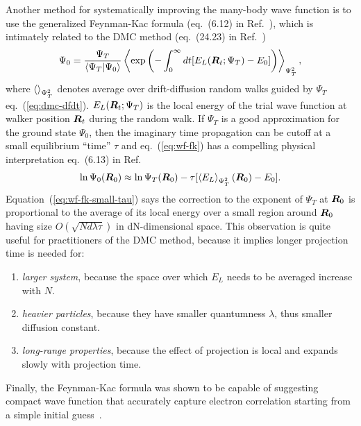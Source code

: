 Another method for systematically improving the many-body wave function is to use the generalized Feynman-Kac formula (eq.~(6.12) in Ref.~\cite{Martin2016}), which is intimately related to the DMC method (eq.~(24.23) in Ref.~\cite{Martin2016})
\begin{align} \label{eq:wf-fk}
\Psi_0 = \dfrac{\Psi_T}{\braket{\Psi_T|\Psi_0}}\left\langle
\exp\left(
-\int_0^\infty dt [E_L(\boldsymbol{R}_t;\Psi_T)-E_0]
\right)
\right\rangle_{\Psi_T^2},
\end{align}
where $\braket{}_{\Psi_T^2}$ denotes average over drift-diffusion random walks guided by $\Psi_T$ eq.~(\ref{eq:dmc-dfdt}). $E_L(\boldsymbol{R}_t;\Psi_T)$ is the local energy of the trial wave function at walker position $\boldsymbol{R}_t$ during the random walk. If $\Psi_T$ is a good approximation for the ground state $\Psi_0$, then the imaginary time propagation can be cutoff at a small equilibrium ``time'' $\tau$ and eq.~(\ref{eq:wf-fk}) has a compelling physical interpretation eq.~(6.13) in Ref.~\cite{Martin2016}
\begin{align} \label{eq:wf-fk-small-tau}
\ln\Psi_0(\boldsymbol{R}_0) \approx \ln\Psi_T(\boldsymbol{R}_0) - \tau [
\left\langle E_L\right\rangle_{\Psi_T^2}(\boldsymbol{R}_0) - E_0
].
\end{align}
Equation~(\ref{eq:wf-fk-small-tau}) says the correction to the exponent of $\Psi_T$ at $\boldsymbol{R}_0$ is proportional to the average of its local energy over a small region around $\boldsymbol{R}_0$ having size $O(\sqrt{N d \lambda\tau})$ in dN-dimensional space. This observation is quite useful for practitioners of the DMC method, because it implies longer projection time is needed for:
\begin{enumerate}
\item \textit{larger system}, because the space over which $E_L$ needs to be averaged increase with $N$.
\item \textit{heavier particles}, because they have smaller quantumness $\lambda$, thus smaller diffusion constant.
\item \textit{long-range properties}, because the effect of projection is local and expands slowly with projection time.
\end{enumerate}

Finally, the Feynman-Kac formula was shown to be capable of suggesting compact wave function that accurately capture electron correlation starting from a simple initial guess~\cite{Holzmann2003}.
